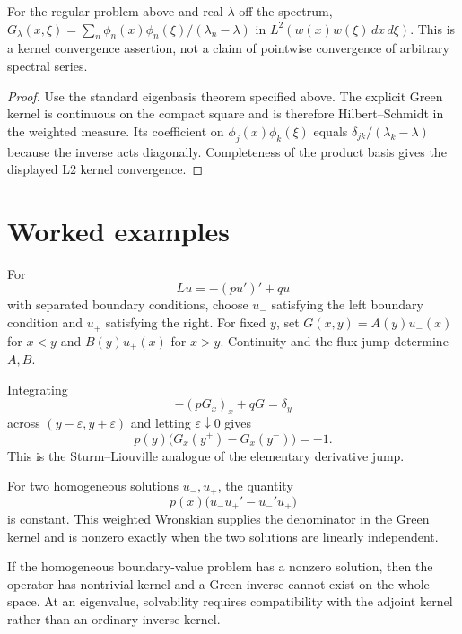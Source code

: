 \begin{theorem}\label{thm:iii26-03}
For the regular problem above and real $\lambda$ off the spectrum, $G_\lambda(x,\xi)=\sum_n\phi_n(x)\phi_n(\xi)/(\lambda_n-\lambda)$ in $L^2(w(x)w(\xi)\,dx\,d\xi)$. This is a kernel convergence assertion, not a claim of pointwise convergence of arbitrary spectral series.
\begin{proof}
Use the standard eigenbasis theorem specified above. The explicit Green kernel is continuous on the compact square and is therefore Hilbert--Schmidt in the weighted measure. Its coefficient on $\phi_j(x)\phi_k(\xi)$ equals $\delta_{jk}/(\lambda_k-\lambda)$ because the inverse acts diagonally. Completeness of the product basis gives the displayed L2 kernel convergence.
\end{proof}
\end{theorem}

\section{Worked examples}

\begin{example}\label{ex:iii26-worked-01}
For
\[
L u=-(p u')'+q u
\]
with separated boundary conditions, choose \(u_-\) satisfying the left
boundary condition and \(u_+\) satisfying the right. For fixed \(y\), set
\(G(x,y)=A(y)u_-(x)\) for \(x<y\) and \(B(y)u_+(x)\) for \(x>y\). Continuity
and the flux jump determine \(A,B\).
\end{example}

\begin{example}\label{ex:iii26-worked-02}
Integrating
\[
-(pG_x)_x+qG=\delta_y
\]
across \((y-\varepsilon,y+\varepsilon)\) and letting
\(\varepsilon\downarrow0\) gives
\[
p(y)\bigl(G_x(y^+)-G_x(y^-)\bigr)=-1.
\]
This is the Sturm--Liouville analogue of the elementary derivative jump.
\end{example}

\begin{example}\label{ex:iii26-worked-03}
For two homogeneous solutions \(u_-,u_+\), the quantity
\[
p(x)\bigl(u_-u_+'-u_-'u_+\bigr)
\]
is constant. This weighted Wronskian supplies the denominator in the Green
kernel and is nonzero exactly when the two solutions are linearly independent.
\end{example}

\begin{example}\label{ex:iii26-worked-04}
If the homogeneous boundary-value problem has a nonzero solution, then the
operator has nontrivial kernel and a Green inverse cannot exist on the whole
space. At an eigenvalue, solvability requires compatibility with the adjoint
kernel rather than an ordinary inverse kernel.
\end{example}

